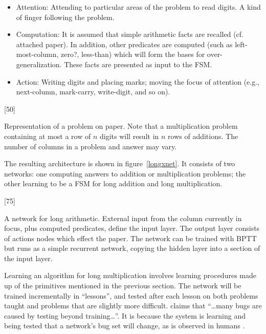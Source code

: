 \begin{itemize}
\item Attention: Attending to particular areas of the problem to
read digits. A kind of finger following the problem.
\item Computation: It is assumed that simple arithmetic facts are recalled
(cf. attached paper).  In addition, other predicates are computed (such as
left-most-column, zero?, less-than) which will form the bases for
over-generalization.  These facts are presented as input to the FSM.
\item Action: Writing digits and placing marks; moving the focus of
attention (e.g., next-column, mark-carry, write-digit, and so on).
\end{itemize}

\begin{fancyfigure}
[50]\vspace{1.8in}
\caption{Representation of a problem on paper.  Note that a
multiplication problem containing at most a row of $n$
digits will result in $n$ rows of additions.  The number of columns in a
problem and answer may vary.}
\label{probrep}
\end{fancyfigure}

The resulting architecture is shown in figure~\ref{longxnet}.  It consists
of two networks: one computing answers to addition or multiplication
problems; the other learning to be a FSM for long addition
and long multiplication.

\begin{fancyfigure}
[75]\vspace{2.6in}
\caption{A network for long arithmetic.  External
input from the column currently in focus, plus computed predicates, define
the input layer.  The output layer consists of actions nodes which effect
the paper.  The network can be trained with BPTT but runs as a simple
recurrent network, copying the hidden layer into a section of the input
layer.}
\label{longxnet}
\end{fancyfigure}


Learning an algorithm for long multiplication involves learning procedures
made up of the primitives mentioned in the previous section.  The network
will be trained incrementally in ``lessons'', and tested after each lesson
on both problems taught and problems that are slightly more difficult.
 claims that ``\ldots many bugs are caused by
testing beyond training\ldots''.  It is because the system is learning and
being tested that a network's bug set will change, as is observed in humans
\cite{nicodesi}.

